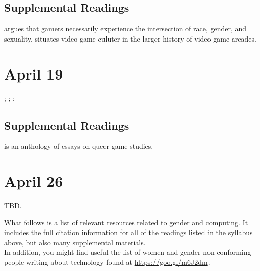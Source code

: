 \documentclass[11pt]{article}
\begin{document}

\subsection{Supplemental Readings}

\cite{Shaw2015} argues that gamers necessarily experience the intersection of race, gender, and sexuality. \cite{Kocurek2015} situates video game culuter in the larger history of video game arcades.

\section{April 19}

; ; ; \cite{Gray2014}

\subsection{Supplemental Readings}

\cite{Ruberg2017} is an anthology of essays on queer game studies.

\section{April 26}

TBD.

\newpage

What follows is a list of relevant resources related to gender and computing. It includes the full citation information for all of the readings listed in the syllabus above, but also many supplemental materials.\\

In addition, you might find useful the list of women and gender non-conforming people writing about technology found at \url{https://goo.gl/m6J2dm}.\\


\nocite{*} 
\printbibliography
\end{document}
